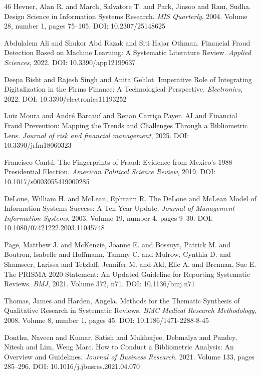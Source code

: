 \documentclass[3p,times,procedia]{elsarticle}
\begin{document}
\begin{thebibliography}{46}
Hevner, Alan R. and March, Salvatore T. and Park, Jinsoo and Ram, Sudha.
Design Science in Information Systems Research.
\textit{MIS Quarterly}, 2004.
Volume 28, number 1, pages 75--105.
DOI: 10.2307/25148625

Abdulalem Ali and Shukor Abd Razak and Siti Hajar Othman.
Financial Fraud Detection Based on Machine Learning: A Systematic Literature Review.
\textit{Applied Sciences}, 2022.
DOI: 10.3390/app12199637

Deepa Bisht and Rajesh Singh and Anita Gehlot.
Imperative Role of Integrating Digitalization in the Firms Finance: A Technological Perspective.
\textit{Electronics}, 2022.
DOI: 10.3390/electronics11193252

Luiz Moura and André Barcauí and Renan Carriço Payer.
AI and Financial Fraud Prevention: Mapping the Trends and Challenges Through a Bibliometric Lens.
\textit{Journal of risk and financial management}, 2025.
DOI: 10.3390/jrfm18060323

Francisco Cantú.
The Fingerprints of Fraud: Evidence from Mexico’s 1988 Presidential Election.
\textit{American Political Science Review}, 2019.
DOI: 10.1017/s0003055419000285

DeLone, William H. and McLean, Ephraim R.
The {DeLone} and {McLean} Model of Information Systems Success: A Ten-Year Update.
\textit{Journal of Management Information Systems}, 2003.
Volume 19, number 4, pages 9--30.
DOI: 10.1080/07421222.2003.11045748

Page, Matthew J. and McKenzie, Joanne E. and Bossuyt, Patrick M. and Boutron, Isabelle and Hoffmann, Tammy C. and Mulrow, Cynthia D. and Shamseer, Larissa and Tetzlaff, Jennifer M. and Akl, Elie A. and Brennan, Sue E.
The {PRISMA} 2020 Statement: An Updated Guideline for Reporting Systematic Reviews.
\textit{BMJ}, 2021.
Volume 372, n71.
DOI: 10.1136/bmj.n71

Thomas, James and Harden, Angela.
Methods for the Thematic Synthesis of Qualitative Research in Systematic Reviews.
\textit{BMC Medical Research Methodology}, 2008.
Volume 8, number 1, pages 45.
DOI: 10.1186/1471-2288-8-45

Donthu, Naveen and Kumar, Satish and Mukherjee, Debmalya and Pandey, Nitesh and Lim, Weng Marc.
How to Conduct a Bibliometric Analysis: An Overview and Guidelines.
\textit{Journal of Business Research}, 2021.
Volume 133, pages 285--296.
DOI: 10.1016/j.jbusres.2021.04.070


\end{thebibliography}
\end{document}
